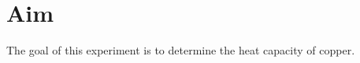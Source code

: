 \section{Aim}
\label{sec:versuchsziel}
The goal of this experiment is to determine the heat capacity of copper.